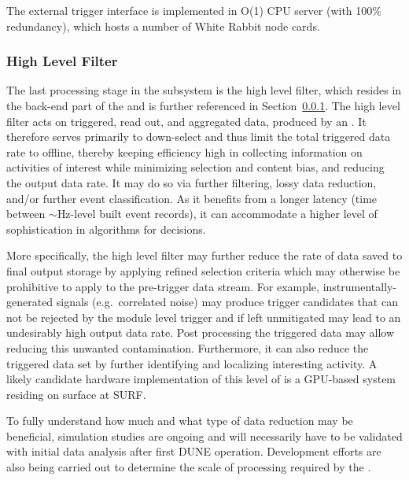 The external trigger interface is implemented in O(1) CPU server (with 100\%
redundancy), which hosts a number of White Rabbit node cards.

\subsubsection{High Level Filter}
\label{sec:fd-daq:design-data-reduction}

The last processing stage in the  subsystem is the
high level filter, which resides in the back-end part of the  and
is further referenced in Section~\ref{sec:fd-daq:design-data-reduction}.
The high level filter acts on triggered, read out, and aggregated data,
produced by an . 
It therefore serves primarily to down-select and thus
limit the total triggered data rate to offline, thereby keeping %
efficiency high in collecting information on activities of interest
while minimizing selection and content bias, and reducing the output data
rate. It may do so via 
further filtering, lossy data reduction, and/or further event
classification. As it benefits from a longer latency (time between
$\sim$Hz-level built event records), it can accommodate a higher level of
sophistication in algorithms for  decisions.

More specifically, the high level filter may further reduce the rate of data saved to final output storage by
applying refined selection criteria which may otherwise be prohibitive
to apply to the pre-trigger data stream.  For example, instrumentally-generated signals (e.g.~correlated noise)
may produce trigger candidates that can not be rejected by the module
level trigger and if left unmitigated may lead to an undesirably high
output data rate. 
Post processing the triggered data may allow reducing this unwanted
contamination.
Furthermore, it can also reduce the triggered data set by further identifying
and localizing interesting activity. A likely candidate hardware
implementation of this level of  is a GPU-based system
residing on surface at SURF.

To fully understand how much and what type of data reduction may be
beneficial, simulation studies are ongoing  and will
necessarily have to be
validated with initial data analysis after
first DUNE  operation. Development efforts are also being
carried out to determine the scale of 
processing required by the .


